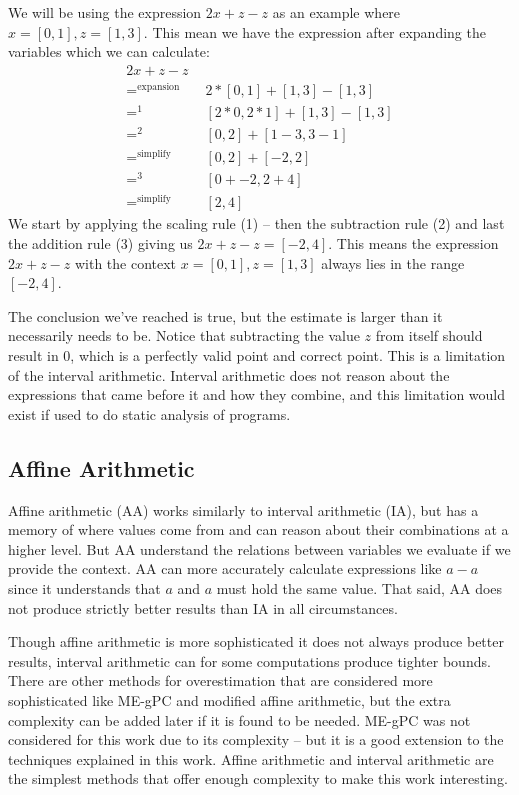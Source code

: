 We will be using the expression $2x + z - z$ as an example where $x = [0, 1], z = [1, 3]$. This mean we have the expression after expanding the variables which we can calculate:
\begin{align*}
  2x + z - z \\
  =^{\text{expansion}} \quad & 2 * [0, 1] + [1, 3] - [1, 3] \\
  =^{1}                \quad & [2 * 0, 2 * 1] + [1, 3] - [1, 3] \\
  =^{2}                \quad & [0, 2] + [1 - 3, 3 - 1] \\
  =^{\text{simplify}}  \quad & [0, 2] + [-2, 2] \\
  =^{3}                \quad & [0 + -2, 2 + 4] \\
  =^{\text{simplify}}  \quad & [2, 4]
\end{align*}
We start by applying the scaling rule (1) -- then the subtraction rule (2) and last the addition rule (3) giving us $2x + z - z = [-2, 4]$. This means the expression $2x + z - z$ with the context $x = [0, 1], z = [1, 3]$ always lies in the range $[-2, 4]$.
\label{sec:prevResultIA}

The conclusion we've reached is true, but the estimate is larger than it necessarily needs to be. Notice that subtracting the value $z$ from itself should result in $0$, which is a perfectly valid point and correct point. This is a limitation of the interval arithmetic. Interval arithmetic does not reason about the expressions that came before it and how they combine, and this limitation would exist if used to do static analysis of programs. 

\subsection{Affine Arithmetic}
Affine arithmetic (AA) works similarly to interval arithmetic (IA), but has a memory of where values come from and can reason about their combinations at a higher level. But AA understand the relations between variables we evaluate if we provide the context. AA can more accurately calculate expressions like $a - a$ since it understands that $a$ and $a$ must hold the same value. That said, AA does not produce strictly better results than IA in all circumstances.\cite{src:affAri}

Though affine arithmetic is more sophisticated it does not always produce better results, interval arithmetic can for some computations produce tighter bounds. There are other methods for overestimation that are considered more sophisticated like ME-gPC \cite{src:MEgPC} and modified affine arithmetic, but the extra complexity can be added later if it is found to be needed. ME-gPC was not considered for this work due to its complexity -- but it is a good extension to the techniques explained in this work. Affine arithmetic and interval arithmetic are the simplest methods that offer enough complexity to make this work interesting.

